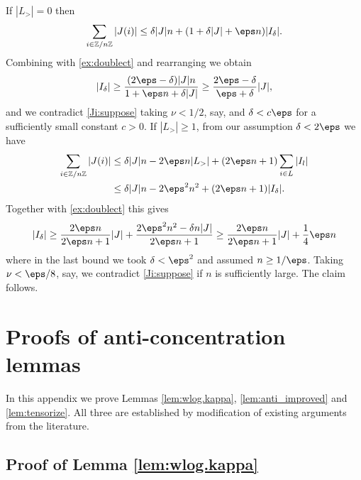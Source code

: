 \documentclass[aop,preprint]{imsart}
\theoremstyle{plain}
\theoremstyle{definition}
\theoremstyle{remark}
\numberwithin{equation}{section}
\numberwithin{theorem}{section}
\def \re {\mathrm{Re}}
\begin{document}
If $|L_>|=0$ then
\begin{align*}
\sum_{i\in \Z/n\Z} |J(i)| \le \delta |J| n + (1+\delta |J|+\eps n) |I_\delta|.
\end{align*}
Combining with \eqref{ex:doublect} and rearranging we obtain 
\[
|I_\delta| \ge \frac{(2\eps - \delta)|J| n}{1+ \eps n + \delta |J|} \ge \frac{2\eps-\delta}{\eps + \delta}|J|,
\]
and we contradict \eqref{Ji:suppose} taking $\nu<1/2$, say, and $\delta<c\eps$ for a sufficiently small constant $c>0$. 
If $|L_>|\ge 1$, from our assumption $\delta<2\eps$ we have
\begin{align*}
\sum_{i\in \Z/n\Z} |J(i)| 
&\le \delta |J| n -2\eps n|L_>| + (2\eps n+1) \sum_{i\in L} |I_l|\\
&\le \delta |J| n - 2\eps^2 n^2+ (2\eps n+1) |I_\delta|.
\end{align*}
Together with \eqref{ex:doublect} this gives
\[
|I_\delta| \ge \frac{2\eps n}{2\eps n+1} |J| + \frac{2\eps^2n^2-\delta n|J|}{2\eps n+1} \ge \frac{2\eps n}{2\eps n+1} |J| + \frac14\eps n
\]
where in the last bound we took $\delta<\eps^2$ and assumed $n\ge 1/\eps$. 
Taking $\nu<\eps/8$, say, we contradict \eqref{Ji:suppose} if $n$ is sufficiently large.
The claim follows.




\section{Proofs of anti-concentration lemmas}
\label{app:anti}

In this appendix we prove Lemmas \ref{lem:wlog.kappa}, \ref{lem:anti_improved} and \ref{lem:tensorize}.
All three are established by modification of existing arguments from the literature.


\subsection{Proof of Lemma \ref{lem:wlog.kappa}}	\label{app:kappa}

\end{document}
